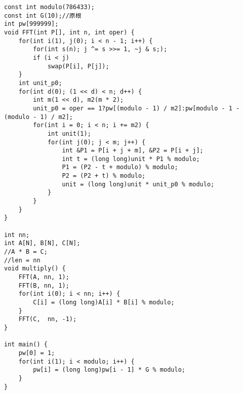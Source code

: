 \begin{lstlisting}
const int modulo(786433);
const int G(10);//原根
int pw[999999];
void FFT(int P[], int n, int oper) {
	for(int i(1), j(0); i < n - 1; i++) {
		for(int s(n); j ^= s >>= 1, ~j & s;);
		if (i < j) 
			swap(P[i], P[j]);
	}
	int unit_p0;
	for(int d(0); (1 << d) < n; d++) {
		int m(1 << d), m2(m * 2);
		unit_p0 = oper == 1?pw[(modulo - 1) / m2]:pw[modulo - 1 - (modulo - 1) / m2];
		for(int i = 0; i < n; i += m2) {
			int unit(1);
			for(int j(0); j < m; j++) {
				int &P1 = P[i + j + m], &P2 = P[i + j];
				int t = (long long)unit * P1 % modulo;
				P1 = (P2 - t + modulo) % modulo;
				P2 = (P2 + t) % modulo;
				unit = (long long)unit * unit_p0 % modulo;
			}
		}
	}
}

int nn;
int A[N], B[N], C[N];
//A * B = C;
//len = nn
void multiply() {
	FFT(A, nn, 1);
	FFT(B, nn, 1);
	for(int i(0); i < nn; i++) {
		C[i] = (long long)A[i] * B[i] % modulo;
	}
	FFT(C,  nn, -1);
}

int main() {
	pw[0] = 1;
	for(int i(1); i < modulo; i++) {
		pw[i] = (long long)pw[i - 1] * G % modulo;
	}
}
\end{lstlisting}
